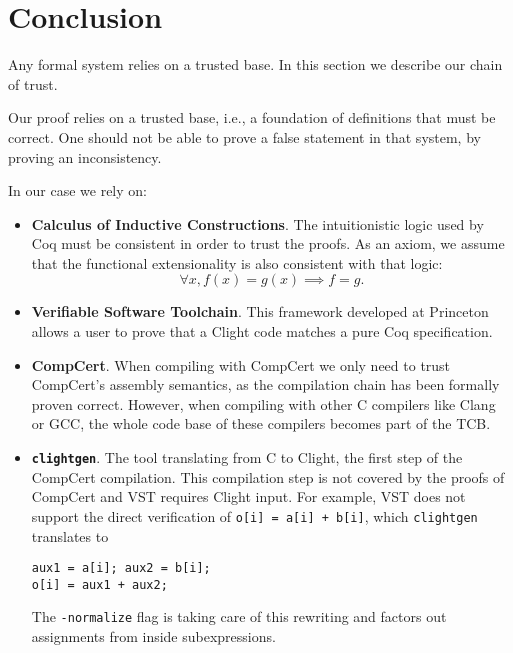\section{Conclusion}
\label{sec:Conclusion}

Any formal system relies on a trusted base. In this section we describe our
chain of trust.

Our proof relies on a trusted base, i.e., a foundation of definitions that must be
correct. One should not be able to prove a false statement in that system, \eg by
proving an inconsistency.

In our case we rely on:
\begin{itemize}
      \item \textbf{Calculus of Inductive Constructions}. The intuitionistic logic
            used by Coq must be consistent in order to trust the proofs. As an axiom,
            we assume that the functional extensionality is also consistent with that logic:
            $$\forall x, f(x) = g(x) \implies f = g.$$

      \item \textbf{Verifiable Software Toolchain}. This framework developed at
            Princeton allows a user to prove that a Clight code matches a pure Coq
            specification.

      \item \textbf{CompCert}. When compiling with CompCert we only need to trust
            CompCert's {assembly} semantics, as the compilation chain has been formally proven correct.
            However, when compiling with other C compilers like Clang or GCC, the
            whole code base of these compilers becomes part of the TCB.

      \item \textbf{\texttt{clightgen}}. The tool translating from {C} to
                  {Clight}, the first step of the CompCert compilation.
            This compilation step is not covered by the proofs of CompCert
            and VST requires Clight input. For example, VST does not support the direct verification of
            \texttt{o[i] = a[i] + b[i]}, which \texttt{clightgen} translates to
            \begin{lstlisting}[language=Ctweetnacl,stepnumber=0,belowskip=-0.5 \baselineskip]
aux1 = a[i]; aux2 = b[i];
o[i] = aux1 + aux2;
\end{lstlisting}
            The \texttt{-normalize} flag is taking care of this
            rewriting and factors out assignments from inside subexpressions.


\end{itemize}
